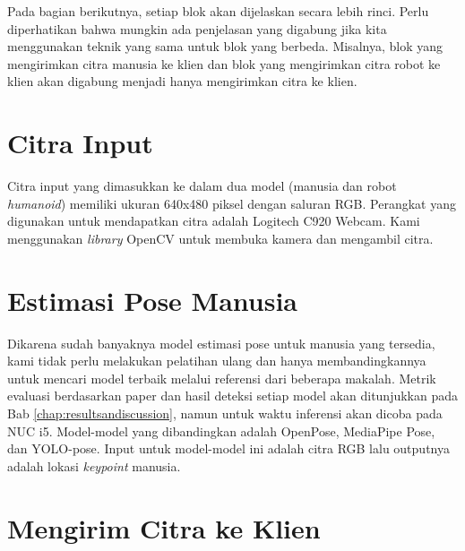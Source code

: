 Pada bagian berikutnya, setiap blok akan dijelaskan secara lebih rinci. Perlu diperhatikan bahwa mungkin ada penjelasan yang digabung jika kita menggunakan teknik yang sama untuk blok yang berbeda.
Misalnya, blok yang mengirimkan citra manusia ke klien dan blok yang mengirimkan citra robot ke klien akan digabung menjadi hanya mengirimkan citra ke klien.


\section{Citra Input}
\label{sec:input-image}

Citra input yang dimasukkan ke dalam dua model (manusia dan robot \textit{humanoid}) memiliki ukuran 640x480 piksel dengan saluran RGB.
Perangkat yang digunakan untuk mendapatkan citra adalah Logitech C920 Webcam. Kami menggunakan \textit{library} OpenCV untuk membuka kamera dan mengambil citra.


\section{Estimasi Pose Manusia}
\label{sec:estimasi-pose-manusia}

Dikarena sudah banyaknya model estimasi pose untuk manusia yang tersedia, kami tidak perlu melakukan pelatihan ulang dan hanya membandingkannya untuk mencari model terbaik melalui referensi dari beberapa makalah.
Metrik evaluasi berdasarkan paper dan hasil deteksi setiap model akan ditunjukkan pada Bab \ref{chap:resultsandiscussion}, namun untuk waktu inferensi akan dicoba pada NUC i5.
Model-model yang dibandingkan adalah OpenPose, MediaPipe Pose, dan YOLO-pose. Input untuk model-model ini adalah citra RGB lalu outputnya adalah lokasi \textit{keypoint} manusia.

\section{Mengirim Citra ke Klien}
\label{sec:send-image-to-client}

